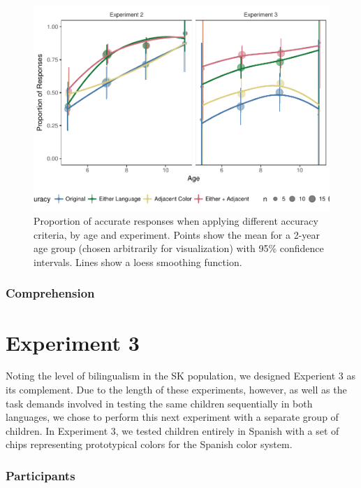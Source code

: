 \documentclass[floatsintext,man]{apa6}
\theoremstyle{definition}
\theoremstyle{definition}
\theoremstyle{definition}
\theoremstyle{remark}
\begin{document}
\begin{figure}
\centering
\includegraphics{amazon_color_files/figure-latex/study23accuracyplots-1.pdf}
\caption{\label{fig:study23accuracyplots}Proportion of accurate responses
when applying different accuracy criteria, by age and experiment. Points
show the mean for a 2-year age group (chosen arbitrarily for
visualization) with 95\% confidence intervals. Lines show a loess
smoothing function.}
\end{figure}

\subsubsection{Comprehension}\label{comprehension}

\section{Experiment 3}\label{experiment-3}

Noting the level of bilingualism in the SK population, we designed
Experient 3 as its complement. Due to the length of these experiments,
however, as well as the task demands involved in testing the same
children sequentially in both languages, we chose to perform this next
experiment with a separate group of children. In Experiment 3, we tested
children entirely in Spanish with a set of chips representing
prototypical colors for the Spanish color system.

\subsubsection{Participants}\label{participants-2}
\end{document}
